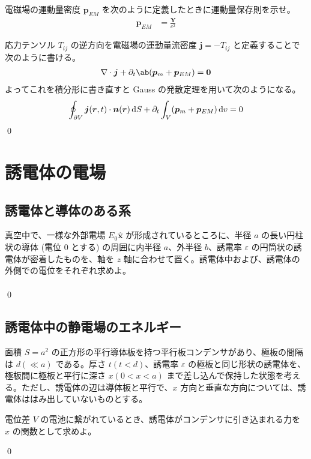 \documentclass[uplatex,dvipdfmx,a4paper,11pt]{jlreq}
\makeatletter
\newcommand{\rr}{\bm{r}}
\newcommand{\pp}{\bm{p}}
\newcommand{\vnabla}{\mathbf{\nabla}}
\theoremstyle{definition}
\renewenvironment{proof}[1][\proofname]{\par
  \normalfont
  \topsep6\p@\@plus6\p@ \trivlist
  \item[\hskip\labelsep{\bfseries #1}\@addpunct{\bfseries}]\ignorespaces\quad\par
}{%
  \qed\endtrivlist\@endpefalse
}
\renewcommand\proofname{証明}
\makeatother
\begin{document}
\begin{problem}
電磁場の運動量密度 $\pp_{EM}$ を次のように定義したときに運動量保存則を示せ。
\begin{align}
  \pp_{EM} & = \frac{\bm{Y}}{c^2}
\end{align}
\end{problem}
\begin{proof}
  応力テンソル $T_{ij}$ の逆方向を電磁場の運動量流密度 $\bm{j} = -T_{ij}$ と定義することで次のように書ける。
  \begin{align}
    \vnabla\cdot\bm{j} + \partial_t\ab(\pp_m + \pp_{EM}) = \bm{0}
  \end{align}
  よってこれを積分形に書き直すと Gauss の発散定理を用いて次のようになる。
  \begin{align}
    \oint_{\partial V}\bm{j}(\rr, t)\cdot\bm{n}(\rr)\dl{S} + \partial_t\int_V(\pp_m + \pp_{EM})\dl{v} = 0
  \end{align}
\end{proof}

\section{誘電体の電場}

\setcounter{subsection}{5}
\subsection{誘電体と導体のある系}
\begin{problem}
真空中で、一様な外部電場 $E_0\hat{\bm{x}}$ が形成されているところに、半径 $a$ の長い円柱状の導体 (電位 $0$ とする) の周囲に内半径 $a$、外半径 $b$、誘電率 $\varepsilon$ の円筒状の誘電体が密着したものを、軸を $z$ 軸に合わせて置く。誘電体中および、誘電体の外側での電位をそれぞれ求めよ。
\end{problem}
\begin{proof}
  \begin{align}
  \end{align}
\end{proof}

\subsection{誘電体中の静電場のエネルギー}
面積 $S = a^2$ の正方形の平行導体板を持つ平行板コンデンサがあり、極板の間隔は $d (\ll a)$ である。厚さ $t (t < d)$、誘電率 $\varepsilon$ の極板と同じ形状の誘電体を、極板間に極板と平行に深さ $x (0 < x < a)$ まで差し込んで保持した状態を考える。ただし、誘電体の辺は導体板と平行で、$x$ 方向と垂直な方向については、誘電体ははみ出していないものとする。
\begin{problem}
電位差 $V$ の電池に繋がれているとき、誘電体がコンデンサに引き込まれる力を $x$ の関数として求めよ。
\end{problem}
\begin{proof}

\end{proof}
\end{document}
